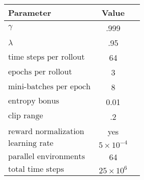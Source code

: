 \begin{tabular}{lcc}
    \toprule
    \textbf{Parameter} & \textbf{Value} \\
    \midrule
    \(\gamma\) & .999 \\
    \(\lambda\) & .95 \\
    \(\text{time steps per rollout}\) & 64 \\
    \(\text{epochs per rollout}\) & 3 \\
    \(\text{mini-batches per epoch}\) & 8 \\
    \(\text{entropy bonus}\) & 0.01 \\
    \(\text{clip range}\) & .2 \\
    \(\text{reward normalization}\) & yes \\
    \(\text{learning rate}\) & \(5 \times 10^{-4}\) \\
    \(\text{parallel environments}\) & 64 \\
    \(\text{total time steps}\) & \(25 \times 10^6\) \\
    \bottomrule
\end{tabular}